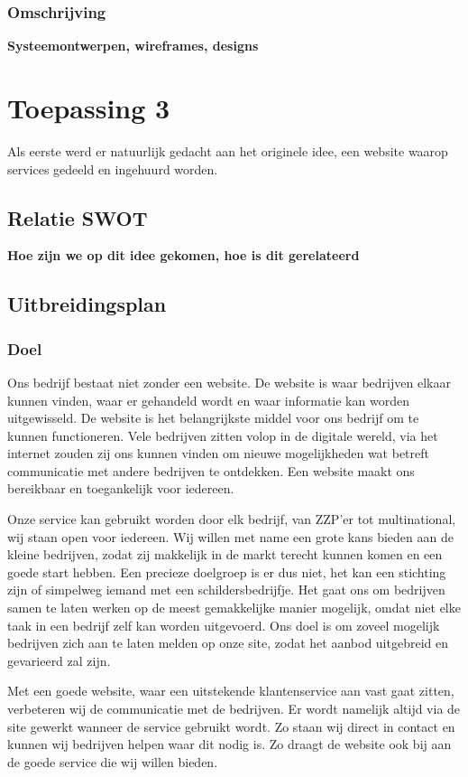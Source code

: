 \subsubsection{Omschrijving}
{\bf Systeemontwerpen, wireframes, designs}


\section{Toepassing 3}

Als eerste werd er natuurlijk gedacht aan het originele idee,
een website waarop services gedeeld en ingehuurd worden.

\subsection{Relatie SWOT}
{\bf Hoe zijn we op dit idee gekomen, hoe is dit gerelateerd}

\subsection{Uitbreidingsplan}

\subsubsection{Doel}
Ons bedrijf bestaat niet zonder een website.
De website is waar bedrijven elkaar kunnen vinden,
waar er gehandeld wordt en waar informatie kan worden uitgewisseld.
De website is het belangrijkste middel voor ons bedrijf om te kunnen functioneren.
Vele bedrijven zitten volop in de digitale wereld,
via het internet zouden zij ons kunnen vinden
om nieuwe mogelijkheden wat betreft communicatie met andere bedrijven te ontdekken.
Een website maakt ons bereikbaar en toegankelijk voor iedereen.

Onze service kan gebruikt worden door elk bedrijf, van ZZP’er tot multinational,
wij staan open voor iedereen.
Wij willen met name een grote kans bieden aan de kleine bedrijven,
zodat zij makkelijk in de markt terecht kunnen komen en een goede start hebben.
Een precieze doelgroep is er dus niet,
het kan een stichting zijn of simpelweg iemand met een schildersbedrijfje.
Het gaat ons om bedrijven samen te laten werken op de meest gemakkelijke manier mogelijk,
omdat niet elke taak in een bedrijf zelf kan worden uitgevoerd.
Ons doel is om zoveel mogelijk bedrijven zich aan te laten melden op onze site,
zodat het aanbod uitgebreid en gevarieerd zal zijn.

Met een goede website,
waar een uitstekende klantenservice aan vast gaat zitten,
verbeteren wij de communicatie met de bedrijven.
Er wordt namelijk altijd via de site gewerkt wanneer de service gebruikt wordt.
Zo staan wij direct in contact en kunnen wij bedrijven helpen waar dit nodig is.
Zo draagt de website ook bij aan de goede service die wij willen bieden.



